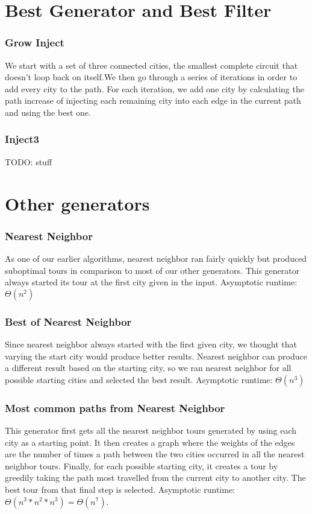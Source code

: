 \documentclass{article}
\begin{document}
\part*{Best Generator and Best Filter}
\section*{Grow Inject}%
We start with a set of three connected cities, the smallest complete circuit that doesn't loop back on itself.We then go through a series of iterations in order to add every city to the path. For each iteration, we add one city by calculating the path increase of injecting each remaining city into each edge in the current path and using the best one.
\section*{Inject3}
TODO: stuff

\part*{Other generators}

\section*{Nearest Neighbor}%
As one of our earlier algorithms, nearest neighbor ran fairly quickly but produced suboptimal tours in comparison to most of our other generators. This generator always started its tour at the first city given in the input. Asymptotic runtime: $\Theta (n^2)$

\section*{Best of Nearest Neighbor}%
Since nearest neighbor always started with the first given city, we thought that varying the start city would produce better results. Nearest neighbor can produce a different result based on the starting city, so we ran nearest neighbor for all possible starting cities and selected the best result. Asymptotic runtime: $\Theta (n^3)$

\section*{Most common paths from Nearest Neighbor}%
This generator first gets all the nearest neighbor tours generated by using each city as a starting point. It then creates a graph where the weights of the edges are the number of times a path between the two cities occurred in all the nearest neighbor tours. Finally, for each possible starting city, it creates a tour by greedily taking the path most travelled from the current city to another city. The best tour from that final step is selected. Asymptotic runtime: $\Theta (n^3 * n^2 * n^3) = \Theta (n^7)$.
\end{document}
